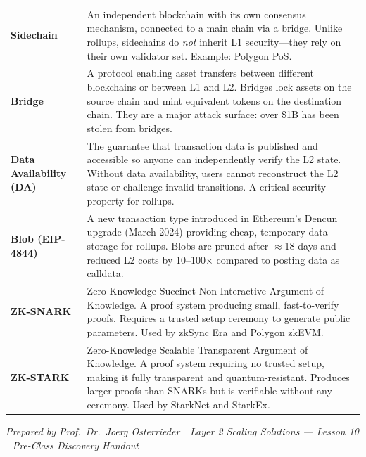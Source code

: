 \documentclass[11pt,a4paper]{article}
\begin{document}
\begin{tabular}{@{}p{3.6cm}p{11.0cm}@{}}
\textbf{Sidechain}                  & An independent blockchain with its own consensus mechanism, connected to a main chain via a bridge. Unlike rollups, sidechains do \emph{not} inherit L1 security---they rely on their own validator set. Example: Polygon PoS. \\
\textbf{Bridge}                     & A protocol enabling asset transfers between different blockchains or between L1 and L2. Bridges lock assets on the source chain and mint equivalent tokens on the destination chain. They are a major attack surface: over \$1B has been stolen from bridges. \\
\textbf{Data Availability (DA)}     & The guarantee that transaction data is published and accessible so anyone can independently verify the L2 state. Without data availability, users cannot reconstruct the L2 state or challenge invalid transitions. A critical security property for rollups. \\
\textbf{Blob (EIP-4844)}            & A new transaction type introduced in Ethereum's Dencun upgrade (March 2024) providing cheap, temporary data storage for rollups. Blobs are pruned after $\approx$18 days and reduced L2 costs by 10--100$\times$ compared to posting data as calldata. \\
\textbf{ZK-SNARK}                   & Zero-Knowledge Succinct Non-Interactive Argument of Knowledge. A proof system producing small, fast-to-verify proofs. Requires a trusted setup ceremony to generate public parameters. Used by zkSync Era and Polygon zkEVM. \\
\textbf{ZK-STARK}                   & Zero-Knowledge Scalable Transparent Argument of Knowledge. A proof system requiring no trusted setup, making it fully transparent and quantum-resistant. Produces larger proofs than SNARKs but is verifiable without any ceremony. Used by StarkNet and StarkEx. \\
\bottomrule
\end{tabular}

\vspace{6pt}
\noindent\textcolor{mlgray}{\small\textit{Prepared by Prof.\ Dr.\ Joerg Osterrieder \,\textbullet\, Layer 2 Scaling Solutions --- Lesson 10 \,\textbullet\, Pre-Class Discovery Handout}}
\end{document}
